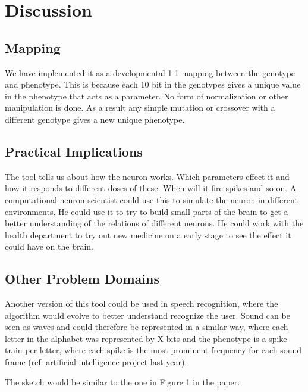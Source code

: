 \documentclass[12pt, a4paper, oneside, titlepage]{article}
\begin{document}
\section{Discussion}

\subsection{Mapping}
We have implemented it as a developmental 1-1 mapping between the genotype and phenotype. This is because each 10 bit in the genotypes gives a unique value in the phenotype that acts as a parameter. No form of normalization or other manipulation is done. As a result any simple mutation or crossover with a different genotype gives a new unique phenotype. 


\subsection{Practical Implications}
The tool tells us about how the neuron works. Which parameters effect it and how it responds to different doses of these. When will it fire spikes and so on. 
A computational neuron scientist could use this to simulate the neuron in different environments. He could use it to try to build small parts of the brain to get a better understanding of the relations of different neurons. 
He could work with the health department to try out new medicine on a early stage to see the effect it could have on the brain.  

\subsection{Other Problem Domains}
Another version of this tool could be used in speech recognition, where the algorithm would evolve to better understand recognize the user. Sound can be seen as waves and could therefore be represented in a similar way, where each letter in the alphabet was represented by X bits and the phenotype is a spike train per letter, where each spike is the most prominent frequency for each sound frame (ref: artificial intelligence project last year). 

The sketch would be similar to the one in Figure 1 in the paper.
\end{document}
